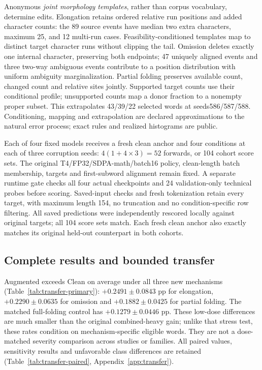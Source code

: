 Anonymous \emph{joint morphology templates}, rather than corpus vocabulary,
determine edits. Elongation retains ordered relative run positions and added
character counts: the 89 source events have median two extra characters,
maximum 25, and 12 multi-run cases. Feasibility-conditioned templates map to
distinct target character runs without clipping the tail. Omission deletes
exactly one internal character, preserving both endpoints; 47 uniquely aligned
events and three two-way ambiguous events contribute to a position distribution
with uniform ambiguity marginalization. Partial folding preserves available
count, changed count and relative sites jointly. Supported target counts use
their conditional profile; unsupported counts map a donor fraction to a nonempty
proper subset. This extrapolates 43/39/22 selected words at seeds586/587/588.
Conditioning, mapping and extrapolation are declared approximations to the
natural error process; exact rules and realized histograms are public.

Each of four fixed models receives a fresh clean anchor and four conditions at
each of three corruption seeds: $4(1+4\times3)=52$ forwards, or 104 cohort score
sets. The original T4/FP32/SDPA-math/batch16 policy, clean-length batch membership,
targets and first-subword alignment remain fixed. A separate runtime gate checks
all four actual checkpoints and 24 validation-only technical probes before
scoring. Saved-input checks and fresh tokenization retain every target, with
maximum length 154, no truncation and no condition-specific row filtering.
All saved predictions were independently rescored locally against original
targets; all 104 score sets match. Each fresh clean anchor also exactly matches
its original held-out counterpart in both cohorts.

\subsection{Complete results and bounded transfer}
\begin{table}[t]
\centering\footnotesize\setlength{\tabcolsep}{3pt}
\caption{Complete supplemental primary matrix, macro-F1 (\%). Noisy cells are
three-corruption-seed means $\pm$ sample SD. Without case uses the same selected
removal checkpoint; no model is retrained.}
\label{tab:transfer-primary}
\TransferPrimary
\end{table}

Augmented exceeds Clean on average under all three new mechanisms
(Table~\ref{tab:transfer-primary}): $+0.2491\pm0.0843$ pp for elongation,
$+0.2290\pm0.0635$ for omission and $+0.1882\pm0.0425$ for partial folding.
The matched full-folding control has $+0.1279\pm0.0446$ pp. These low-dose
differences are much smaller than the original combined-heavy gain; unlike
that stress test, these rates condition on mechanism-specific eligible words.
They are not a dose-matched severity comparison across studies or families.
All paired values, sensitivity results and unfavorable class differences are
retained (Table~\ref{tab:transfer-paired}, Appendix~\ref{app:transfer}).

